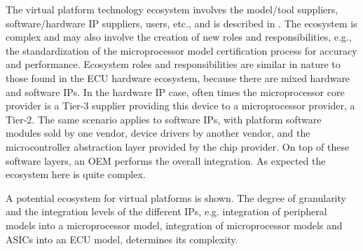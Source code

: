 The virtual platform technology ecosystem involves the model/tool suppliers, software/hardware IP suppliers, users, etc., and is described in \cite{Knauss2014d}.
The ecosystem is complex and may also involve the creation of new roles and responsibilities,
e.g., the standardization of the microprocessor model certification process  for accuracy and performance.
Ecosystem roles and responsibilities are similar in nature to those found in the ECU hardware ecosystem, because there are mixed hardware and software IPs.
In the hardware IP case, often times the microprocessor core provider is a Tier-3 supplier providing this device to a microprocessor provider, a Tier-2.
The same scenario applies to software IPs, with platform software modules sold by one vendor, device drivers by another vendor, and the microcontroller abstraction layer provided by the chip provider.
On top of these software layers, an OEM performs the overall integration. As expected the ecosystem here is quite complex.

A potential ecosystem for virtual platforms is shown.
The degree of granularity and the integration levels of the different IPs,
e.g. integration of peripheral models into a microprocessor model, integration of microprocessor models and ASICs into an ECU model,
determines its complexity.
